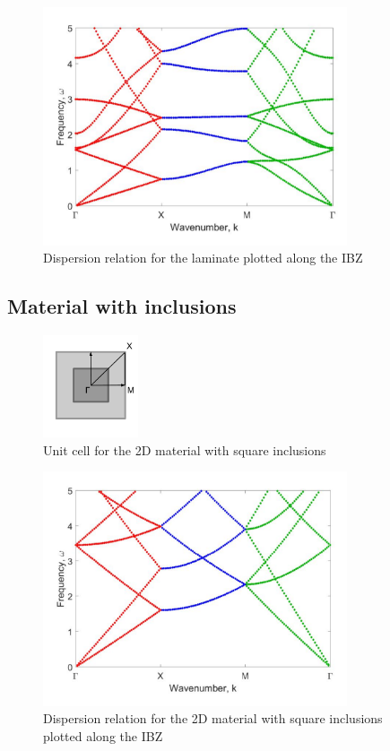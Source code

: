 \documentclass{article}
\begin{document}
\begin{figure}[!htbp]
	\centering
	\includegraphics[width=0.8\textwidth]{twodlayrd.pdf}
	\caption{Dispersion relation for the laminate plotted along the IBZ}
	\label{fig:twodlayrd}
\end{figure}

\subsection{Material with inclusions}
\begin{figure}[!htbp]
	\centering
	\includegraphics[width=0.25\textwidth]{twodrescell.pdf}
	\caption{Unit cell for the 2D material with square inclusions}
	\label{fig:twodrescell}
\end{figure}
\begin{figure}[!htbp]
	\centering
	\includegraphics[width=0.8\textwidth]{twodunif.pdf}
	\caption{Dispersion relation for the 2D material with 
	square inclusions plotted along the IBZ}
	\label{fig:twodres}
\end{figure}
\end{document}
